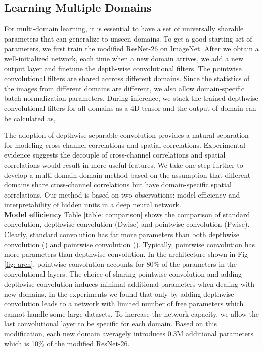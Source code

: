 \documentclass[letterpaper]{article} \usepackage{aaai19}  \usepackage{times}  \usepackage{helvet}  \usepackage{courier}  \usepackage{url}  \usepackage{graphicx}  \usepackage{amssymb}
\begin{document}
\subsection{Learning Multiple Domains}
For multi-domain learning, it is essential to have a set of universally sharable parameters that can generalize to unseen domains. To get a good starting set of parameters, we first train the modified ResNet-26 on ImageNet. After we obtain a well-initialized network, each time when a new domain arrives, we add a new output layer and finetune the depth-wise convolutional filters. The pointwise convolutional filters are shared accross different domains. Since the statistics of the images from different domains are different, we also allow domain-specific batch normalization parameters. During inference, we stack the trained depthwise convolutional filters for all domains as a 4D tensor and the output of domain  can be calculated as,


The adoption of depthwise separable convolution provides a natural separation for modeling cross-channel correlations and spatial correlations. Experimental evidence \cite{chollet2017xception} suggests the decouple of cross-channel correlations and spatial correlations would result in more useful features. We take one step further to develop a multi-domain domain method based on the assumption that different domains share cross-channel correlations but have domain-specific spatial correlations. Our method is based on two observations: model efficiency and interpretability of hidden units in a deep neural network.  \\

\noindent\textbf{Model efficiency} Table \ref{table: comparison} shows the comparison of standard  convolution,  depthwise convolution (Dwise) and  pointwise convolution (Pwise). Clearly, standard convolution has far more parameters than both depthwise convolution () and pointwise convolution (). Typically, pointwise convolution has more parameters than depthwise convolution. In the architecture shown in Fig \ref{fig: arch}, pointwise convolution accounts for 80\% of the parameters in the convolutional layers. The choice of sharing pointwise convolution and adding depthwise convolution induces minimal additional parameters when dealing with new domains. In the experiments we found that only by adding depthwise convolution leads to a network with limited number of free parameters which cannot handle some large datasets. To increase the network capacity, we allow the last convolutional layer to be specific for each domain. Based on this modification, each new domain averagely introduces 0.3M additional parameters which is 10\% of the modified ResNet-26.
\\
\end{document}
